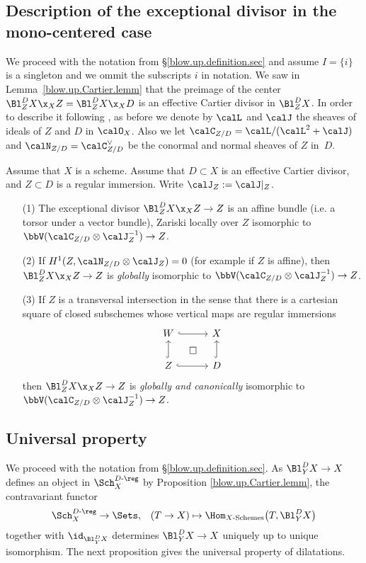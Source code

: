 \documentclass[10pt]{alggeom}
\theoremstyle{definition}
\numberwithin{equation}{section}
\begin{document}
\subsection{Description of the exceptional divisor in the mono-centered case}
We proceed with the notation from \S\ref{blow.up.definition.sec} and assume $I= \{i\}$ is a singleton and we ommit the subscripts $i$ in notation.
We saw in Lemma~\ref{blow.up.Cartier.lemm} that the preimage of the center
$\Bl_Z^DX\x_XZ=\Bl_Z^DX\x_XD$ is an effective Cartier divisor in $\Bl_Z^DX$.
In order to describe it following \cite{MRR20}, as before we denote by $\calL$ and $\calJ$
the sheaves of ideals of $Z$ and $D$ in $\calO_X$. Also we let
$\calC_{Z/D}=\calL/(\calL^2+\calJ)$ and $\calN_{Z/D}=\calC_{Z/D}^\vee$
be the conormal and normal sheaves of $Z$ in~$D$.


 \label{exceptional divisor} Assume that $X$ is a scheme.
Assume that $D\subset X$ is an effective Cartier divisor, and $Z\subset D$ is a regular immersion. Write $\calJ_Z:=\calJ|_Z$.
\begin{enumerate}
\item[(1)] The exceptional divisor $\Bl_Z^DX\x_XZ\to Z$ is an
affine bundle (i.e. a torsor under a vector bundle), Zariski
locally over $Z$ isomorphic
to
$\bbV(\calC_{Z/D}\otimes \calJ_Z^{-1})\to Z$.
\item[(2)] If $H^1(Z,\calN_{Z/D}\otimes \calJ_Z)=0$ (for example if $Z$ is affine),
then $\Bl_Z^DX\x_XZ\to Z$ is {\em globally} isomorphic to
$\bbV(\calC_{Z/D}\otimes \calJ_Z^{-1})\to Z$.
\item[(3)] If $Z$ is a transversal intersection in the sense that there
is a cartesian square of closed subschemes whose vertical maps are
regular immersions
\[
\begin{tikzcd}[column sep=30]
W \ar[r,hook] \arrow[rd, "\square",phantom] & X \\
Z \ar[r,hook] \ar[u,hook] & D \ar[u,hook]
\end{tikzcd}
\]
then $\Bl_Z^DX\x_XZ\to Z$ is {\em globally and canonically} isomorphic
to $\bbV(\calC_{Z/D}\otimes \calJ_Z^{-1})\to Z$.
\end{enumerate}
\xprop




\subsection{Universal property}\label{blow.up.univ.ppty.section}
We proceed with the notation from \S\ref{blow.up.definition.sec}.
As $\Bl_Y^DX\to X$ defines an object in $\Sch_X^{D\text{-}\reg}$ by Proposition \ref{blow.up.Cartier.lemm}, the contravariant functor
\begin{equation}\label{blow.up.represent.eq}
\Sch_X^{D \text{-}\reg}\to \Sets, \;\;\;(T\to X)\mapsto \Hom_{X\text{-Schemes}}\big(T,\Bl_Y^DX\big)
\end{equation}
together with $\id_{\Bl_Y^DX}$ determines $\Bl_Y^DX\to X$ uniquely up to unique isomorphism.
The next proposition gives the universal property of dilatations.
\end{document}
